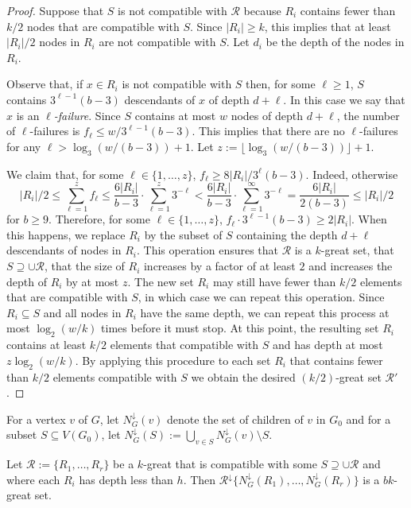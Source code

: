\documentclass{patmorin}
\newcommand{\defin}[1]{\emph{\color{brightmaroon}#1}}
\begin{document}
\begin{proof}
  Suppose that $S$ is not compatible with $\mathcal{R}$ because $R_i$ contains fewer than $k/2$ nodes that are compatible with $S$.  Since $|R_i|\ge k$, this implies that at least $|R_i|/2$ nodes in $R_i$ are not compatible with $S$. Let $d_i$ be the depth of the nodes in $R_i$.  

  Observe that, if $x\in R_i$ is not compatible with $S$ then, for some $\ell\ge 1$, $S$ contains $3^{\ell-1}(b-3)$ descendants of $x$ of depth $d+\ell$.  In this case we say that $x$ is an \defin{$\ell$-failure}. Since $S$ contains at most $w$ nodes of depth $d+\ell$, the number of $\ell$-failures is 
  $f_\ell \le w/3^{\ell-1}(b-3)$.  This implies that there are no $\ell$-failures for any $\ell > \log_3 (w/(b-3)) + 1$.  Let $z:= \lfloor\log_3 (w/(b-3))\rfloor + 1$.

  We claim that, for some $\ell\in\{1,\ldots,z\}$, $f_\ell \ge 8|R_i|/3^{\ell}(b-3)$.  Indeed, otherwise
  \[
    |R_i|/2 \le \sum_{\ell=1}^{z} f_\ell \le \frac{6|R_i|}{b-3}\cdot \sum_{\ell=1}^z 3^{-\ell} < \frac{6|R_i|}{b-3}\cdot \sum_{\ell=1}^\infty 3^{-\ell}
    = \frac{6|R_i|}{2(b-3)}  \le  |R_i|/2
  \]
  for $b\ge 9$. Therefore, for some $\ell\in\{1,\ldots,z\}$, $f_\ell\cdot 3^{\ell-1}(b-3) \ge 2|R_i|$.  When this happens, we replace $R_i$ by the subset of $S$ containing the depth $d+\ell$ descendants of nodes in $R_i$.  This operation ensures that $\mathcal{R}$ is a $k$-great set, that $S\supseteq \cup\mathcal{R}$, that the size of $R_i$ increases by a factor of at least $2$ and increases the depth of $R_i$ by at most $z$. The new set $R_i$ may still have fewer than $k/2$ elements that are compatible with $S$, in which case we can repeat this operation.  Since $R_i\subseteq S$ and all nodes in $R_i$ have the same depth, we can repeat this process at most $\log_2(w/k)$ times before it must stop.  At this point, the resulting set $R_i$ contains at least $k/2$ elements that compatible with $S$ and has depth at most $z\log_2(w/k)$. By applying this procedure to each set $R_i$ that contains fewer than $k/2$ elements compatible with $S$ we obtain the desired $(k/2)$-great set $\mathcal{R}'$.
\end{proof}

For a vertex $v$ of $G$, let $N^\downarrow_{G}(v)$ denote the set of children of $v$ in $G_0$ and for a subset $S\subseteq V(G_0)$, let $N^\downarrow_G(S):=\bigcup_{v\in S}N^\downarrow_G(v)\setminus S$.

\begin{obs}
  Let $\mathcal{R}:=\{R_1,\ldots,R_r\}$ be a $k$-great that is compatible with some $S\supseteq \cup \mathcal{R}$ and where each $R_i$ has depth less than $h$.  Then $\mathcal{R}^{\downarrow}\{N^{\downarrow}_G(R_1),\ldots,N^{\downarrow}_G(R_r)\}$ is a $bk$-great set.
\end{obs}
\end{document}
